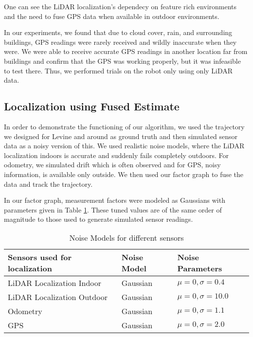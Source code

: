 \documentclass[10pt, reqno, letterpaper, twoside]{amsart}
\begin{document}
One can see the LiDAR localization's  dependecy on feature rich environments and the need to fuse GPS data when available in outdoor environments.

In our experiments, we found that due to cloud cover, rain, and surrounding buildings, GPS readings were rarely received and wildly inaccurate when they were. We were able to receive accurate GPS readings in another location far from buildings and confirm that the GPS was working properly, but it was infeasible to test there. Thus, we performed trials on the robot only using only LiDAR data.


\subsection{Localization using Fused Estimate}
In order to demonstrate the functioning of our algorithm, we used the trajectory we designed for Levine and around as ground truth and then simulated sensor data as a noisy version of this. We used realistic noise models, where the LiDAR localization indoors is accurate and suddenly fails completely outdoors. For odometry, we simulated drift which is often observed and for GPS, noisy information, is available only outside. We then used our factor graph to fuse the data and track the trajectory. 

In our factor graph, measurement factors were modeled as Gaussians with parameters given in Table \ref{tab:Noise}. These tuned values are of the same order of magnitude to those used to generate simulated sensor readings.

\begin{table}[h]
\centering
\begin{tabular}{@{}lll@{}}
\toprule
Sensors used for localization & Noise Model & Noise Parameters \\ \midrule
LiDAR Localization Indoor & Gaussian & $\mu = 0, \sigma = 0.4$ \\
LiDAR Localization Outdoor & Gaussian & $\mu = 0, \sigma = 10.0$ \\
Odometry & Gaussian & $\mu = 0, \sigma = 1.1$ \\

GPS & Gaussian & $\mu = 0, \sigma = 2.0$ \\ \bottomrule
\end{tabular}
\caption{Noise Models for different sensors}
\label{tab:Noise}
\end{table}
\end{document}
